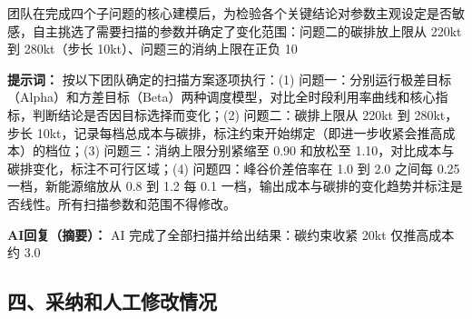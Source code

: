 团队在完成四个子问题的核心建模后，为检验各个关键结论对参数主观设定是否敏感，自主挑选了需要扫描的参数并确定了变化范围：问题二的碳排放上限从 220kt 到 280kt（步长 10kt）、问题三的消纳上限在正负 10%

\textbf{提示词：} 按以下团队确定的扫描方案逐项执行：(1) 问题一：分别运行极差目标（Alpha）和方差目标（Beta）两种调度模型，对比全时段利用率曲线和核心指标，判断结论是否因目标选择而变化；(2) 问题二：碳排上限从 220kt 到 280kt，步长 10kt，记录每档总成本与碳排，标注约束开始绑定（即进一步收紧会推高成本）的档位；(3) 问题三：消纳上限分别紧缩至 0.90 和放松至 1.10，对比成本与碳排变化，标注不可行区域；(4) 问题四：峰谷价差倍率在 1.0 到 2.0 之间每 0.25 一档，新能源缩放从 0.8 到 1.2 每 0.1 一档，输出成本与碳排的变化趋势并标注是否线性。所有扫描参数和范围不得修改。

\textbf{AI回复（摘要）：} AI 完成了全部扫描并给出结果：碳约束收紧 20kt 仅推高成本约 3.0%

\subsection*{四、采纳和人工修改情况}

